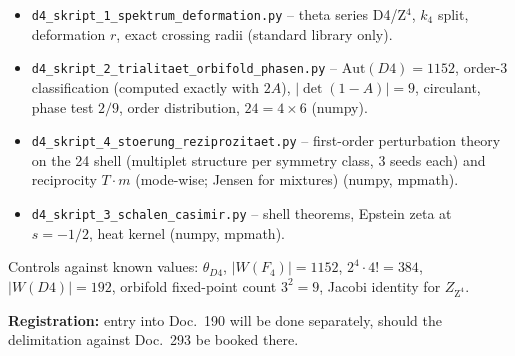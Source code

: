 \documentclass[11pt]{report}
\begin{document}
\begin{itemize}
  \item \texttt{d4\_skript\_1\_spektrum\_deformation.py} --
        theta series D4/Z$^4$, $k_4$ split, deformation $r$, exact
        crossing radii (standard library only).
  \item \texttt{d4\_skript\_2\_trialitaet\_orbifold\_phasen.py} --
        $\text{Aut}(D4) = 1152$, order-3 classification (computed
        exactly with $2A$), $|\det(1-A)| = 9$, circulant, phase test
        $2/9$, order distribution, $24 = 4\times6$ (numpy).
  \item \texttt{d4\_skript\_4\_stoerung\_reziprozitaet.py} --
        first-order perturbation theory on the 24 shell (multiplet
        structure per symmetry class, 3 seeds each) and
        reciprocity $T\cdot m$ (mode-wise; Jensen for mixtures)
        (numpy, mpmath).
  \item \texttt{d4\_skript\_3\_schalen\_casimir.py} --
        shell theorems, Epstein zeta at $s = -1/2$, heat kernel
        (numpy, mpmath).
\end{itemize}

Controls against known values: $\theta_{D4}$, $|W(F_4)| = 1152$,
$2^4\cdot4! = 384$, $|W(D4)| = 192$, orbifold fixed-point count
$3^2 = 9$, Jacobi identity for $Z_{\text{Z}^4}$.

\medskip
\noindent\textbf{Registration:} entry into Doc.~190 will be done
separately, should the delimitation against Doc.~293 be booked
there.
\end{document}
